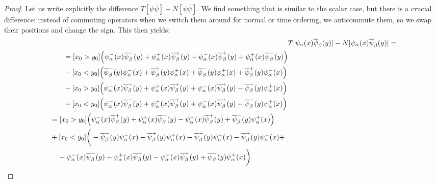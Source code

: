 \documentclass[main.tex]{subfiles}
\begin{document}
\begin{proof}
Let us write explicitly the difference \(T[\psi \overline{\psi}] - N[\psi \overline{\psi}]\). We find something that is similar to the scalar case, but there is a crucial difference: instead of commuting operators when we switch them around for normal or time ordering, we anticommute them, so we swap their positions and change the sign. This then yields: 
%
\begin{align}
&T[\psi_{\alpha } (x) \overline{\psi}_{\beta } (y)] - N[\psi_{\alpha } (x) \overline{\psi}_{\beta } (y)] = \\
\begin{split}
&= 
[x_0 > y_0 ] \qty(
    \psi_{\alpha }^{-} (x) \overline{\psi}^{-}_{\beta }(y)+
    \psi_{\alpha }^{+} (x) \overline{\psi}^{+}_{\beta }(y)+
    \psi_{\alpha }^{-} (x) \overline{\psi}^{+}_{\beta }(y)+
    \psi_{\alpha }^{+} (x) \overline{\psi}^{-}_{\beta }(y)
) \\
&-
[x_0 < y_0 ]\qty(
    \overline{\psi}_{\beta }^{-} (y) \psi^{-}_{\alpha } (x)+
    \overline{\psi}_{\beta }^{+} (y) \psi^{+}_{\alpha } (x)+
    \overline{\psi}_{\beta }^{-} (y) \psi^{+}_{\alpha } (x)+
    \overline{\psi}_{\beta }^{+} (y) \psi^{-}_{\alpha } (x)
)  \\
&- 
[x_0 > y_0 ] \qty(
    \psi_{\alpha }^{-}(x) \overline{\psi}_{\beta }^{-}(y)+
    \psi_{\alpha }^{+}(x) \overline{\psi}_{\beta }^{+}(y)+
    \psi_{\alpha }^{-}(x) \overline{\psi}_{\beta }^{+}(y)-
    \overline{\psi}_{\beta }^{-}(y) \psi_{\alpha }^{+}(x) 
)\\
&- 
[x_0 < y_0 ] \qty(
    \psi_{\alpha }^{-}(x) \overline{\psi}_{\beta }^{-}(y)+
    \psi_{\alpha }^{+}(x) \overline{\psi}_{\beta }^{+}(y)+
    \psi_{\alpha }^{-}(x) \overline{\psi}_{\beta }^{+}(y)-
    \overline{\psi}_{\beta }^{-}(y) \psi_{\alpha }^{+}(x) 
)
\end{split}\\
\begin{split}
&= [x_0 > y_0 ]\qty(
    \psi_{\alpha }^{-} (x) \overline{\psi}^{+}_{\beta }(y)+
    \psi_{\alpha }^{+} (x) \overline{\psi}^{-}_{\beta }(y)-
    \psi_{\alpha }^{-}(x) \overline{\psi}_{\beta }^{+}(y)+
    \overline{\psi}_{\beta }^{-}(y) \psi_{\alpha }^{+}(x) 
) \\ 
&+
[x_0 < y_0 ]\bigg(-
    \overline{\psi}_{\beta }^{-} (y) \psi^{-}_{\alpha } (x)-
    \overline{\psi}_{\beta }^{+} (y) \psi^{+}_{\alpha } (x)-
    \overline{\psi}_{\beta }^{-} (y) \psi^{+}_{\alpha } (x)-
    \overline{\psi}_{\beta }^{+} (y) \psi^{-}_{\alpha } (x)+\\
    &\phantom{=}\ 
    -\psi_{\alpha }^{-}(x) \overline{\psi}_{\beta }^{-}(y)-
    \psi_{\alpha }^{+}(x) \overline{\psi}_{\beta }^{+}(y)-
    \psi_{\alpha }^{-}(x) \overline{\psi}_{\beta }^{+}(y)+
    \overline{\psi}_{\beta }^{-}(y) \psi_{\alpha }^{+}(x) 
\bigg)
\end{split}
\,.
\end{align}

\end{proof}
\end{document}
